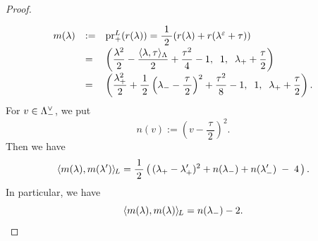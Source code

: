 \documentclass{amsart} %
\begin{document}
\begin{proof}
%
%
\begin{equation}\label{eq:defmlambda}
\renewcommand{\arraystretch}{2}
\begin{array}{lll}
m(\lambda) &:=& \prLplus(\LeechRoot{\lambda})=\dfrac{\;1\;}{2}(\LeechRoot{\lambda}+
\LeechRoot{\lambda^\vep+\tau})\\
&=&
\left(\dfrac{\lambda^2}{2}-\dfrac{\intfLeech{\lambda, \tau}}{2}+\dfrac{\tau^2}{4}-1, 
\;\; 1,\;\; \lambdaplus +\dfrac{\tau}{2}\right)\\
&=&
\left(
\dfrac{\lambdaplus^2}{2}+\dfrac{1}{\,2\,}\left(\lambdaminus-\dfrac{\tau}{\,2\,}\right)^2+\dfrac{\tau^2}{8}-1, 
\;\; 1,\;\; \lambdaplus +\dfrac{\tau}{2}\right).
\end{array}
\end{equation}
%
For $v\in \Lambda_{-}^{\vee}$,
we put
\[
n(v):=\left(v-\dfrac{\,\tau\,}{2}\right)^2.
\]
Then we have
%
\begin{equation}\label{eq:mlmlsprime}
 \langle m(\lambda), m(\lambda^{\prime}) \rangle_{\hskip -1pt L} =\frac{1}{\,2\,}
 \left(\,
({\lambda}_{+} - {\lambda}_{+}^{\prime} )^2
+
n({\lambda}_{-})
+
n({\lambda}_{-}^{\prime})
\;-\;4 
\,\right).
\end{equation}
%
In particular, we have 
%
\[
\langle m(\lambda), m(\lambda) \rangle_{\hskip -1pt L}=n({\lambda}_{-})-2.
\]


\end{proof}
\end{document}
